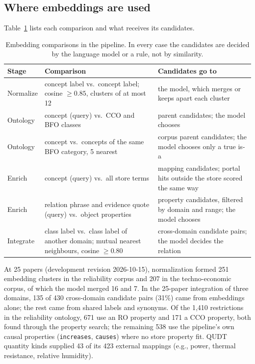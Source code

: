 \subsection{Where embeddings are used}

Table~\ref{tab:embedding-uses} lists each comparison and what receives its candidates.

\begin{table}[t]
\centering
\caption{Embedding comparisons in the pipeline. In every case the candidates are decided by the language model or a rule, not by similarity.}\label{tab:embedding-uses}
\small
\begin{tabular}{p{2cm}p{6.4cm}p{6.4cm}}
\hline
Stage & Comparison & Candidates go to \\
\hline
Normalize & concept label vs.\ concept label; cosine $\geq 0.85$, clusters of at most 12 & the model, which merges or keeps apart each cluster \\
Ontology & concept (query) vs.\ CCO and BFO classes & parent candidates; the model chooses \\
Ontology & concept vs.\ concepts of the same BFO category, 5 nearest & corpus parent candidates; the model chooses only a true is-a \\
Enrich & concept (query) vs.\ all store terms & mapping candidates; portal hits outside the store scored the same way \\
Enrich & relation phrase and evidence quote (query) vs.\ object properties & property candidates, filtered by domain and range; the model chooses \\
Integrate & class label vs.\ class label of another domain; mutual nearest neighbours, cosine $\geq 0.80$ & cross-domain candidate pairs; the model decides the relation \\
\hline
\end{tabular}
\end{table}

At 25 papers (development revision 2026-10-15), normalization formed 251 embedding clusters in the reliability corpus and 207 in the techno-economic corpus, of which the model merged 16 and 7. In the 25-paper integration of three domains, 135 of 430 cross-domain candidate pairs (31\%) came from embeddings alone; the rest came from shared labels and synonyms. Of the 1,410 restrictions in the reliability ontology, 671 use an RO property and 171 a CCO property, both found through the property search; the remaining 538 use the pipeline's own causal properties (\texttt{increases}, \texttt{causes}) where no store property fit. QUDT quantity kinds supplied 43 of its 423 external mappings (e.g., power, thermal resistance, relative humidity).


